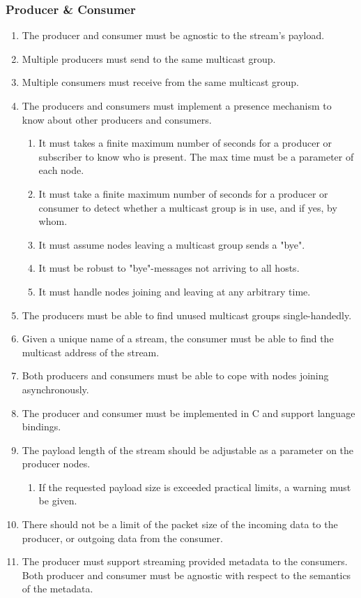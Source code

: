 \subsubsection{Producer \& Consumer}
\begin{enumerate}
	\item The producer and consumer must be agnostic to the stream's payload.
	\item Multiple producers must send to the same multicast group.
	\item Multiple consumers must receive from the same multicast group.
	\item The producers and consumers must implement a presence mechanism to know about other producers and consumers.
	\begin{enumerate}
		\item It must takes a finite maximum number of seconds for a producer or subscriber to know who is present. The max time must be a parameter of each node.
		\item It must take a finite maximum number of seconds for a producer or consumer to detect whether a multicast group is in use, and if yes, by whom.
		\item It must assume nodes leaving a multicast group sends a "bye".
		\item It must be robust to "bye"-messages not arriving to all hosts.
		\item It must handle nodes joining and leaving at any arbitrary time.
	\end{enumerate}
	\item The producers must be able to find unused multicast groups single-handedly.
	\item Given a unique name of a stream, the consumer must be able to find the multicast address of the stream.
	\item Both producers and consumers must be able to cope with nodes joining asynchronously.
	\item The producer and consumer must be implemented in C and support language bindings.
	\item The payload length of the stream should be adjustable as a parameter on the producer nodes.
		\begin{enumerate}
			\item If the requested payload size is exceeded practical limits, a warning must be given.
		\end{enumerate}
	\item There should not be a limit of the packet size of the incoming data to the producer, or outgoing data from the consumer.
	\item The producer must support streaming provided metadata to the consumers. Both producer and consumer must be agnostic with respect to the semantics of the metadata.
\end{enumerate}


